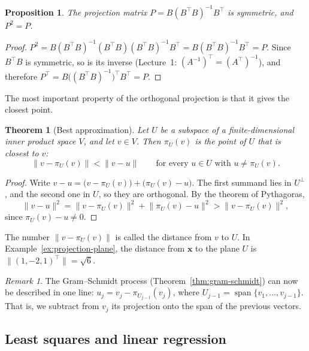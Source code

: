 \documentclass[11pt]{article}
\newcommand{\norm}[1]{\lVert #1 \rVert}
\theoremstyle{definition}
\theoremstyle{plain}
\newtheorem{theorem}[definition]{Theorem}
\newtheorem{proposition}[definition]{Proposition}
\theoremstyle{remark}
\newtheorem{remark}[definition]{Remark}
\DeclareMathOperator{\Span}{span}
\begin{document}
\begin{proposition}\label{prop:projection-matrix}
    The projection matrix $P = B(B^\top B)^{-1}B^\top$ is symmetric, and $P^2 = P$.
\end{proposition}

\begin{proof}
    $P^2 = B(B^\top B)^{-1} (B^\top B) (B^\top B)^{-1} B^\top = B (B^\top B)^{-1} B^\top = P$. Since $B^\top B$ is symmetric, so is its inverse (Lecture~1: $(A^{-1})^\top = (A^\top)^{-1}$), and therefore $P^\top = B \big((B^\top B)^{-1}\big)^\top B^\top = P$.
\end{proof}

The most important property of the orthogonal projection is that it gives the closest point.

\begin{theorem}[Best approximation]\label{thm:best-approximation}
    Let $U$ be a subspace of a finite-dimensional inner product space $V$, and let $v \in V$. Then $\pi_U(v)$ is the point of $U$ that is closest to $v$:
    \[\norm{v - \pi_U(v)} < \norm{v - u} \qquad \text{for every } u \in U \text{ with } u \neq \pi_U(v).\]
\end{theorem}

\begin{proof}
    Write $v - u = \big(v - \pi_U(v)\big) + \big(\pi_U(v) - u\big)$. The first summand lies in $U^\perp$, and the second one in $U$, so they are orthogonal. By the theorem of Pythagoras,
    \[\norm{v - u}^2 = \norm{v - \pi_U(v)}^2 + \norm{\pi_U(v) - u}^2 > \norm{v - \pi_U(v)}^2,\]
    since $\pi_U(v) - u \neq 0$.
\end{proof}

The number $\norm{v - \pi_U(v)}$ is called the distance from $v$ to $U$. In Example~\ref{ex:projection-plane}, the distance from $\mathbf{x}$ to the plane $U$ is $\norm{(1, -2, 1)^\top} = \sqrt{6}$.

\begin{remark}
    The Gram--Schmidt process (Theorem~\ref{thm:gram-schmidt}) can now be described in one line: $u_j = v_j - \pi_{U_{j-1}}(v_j)$, where $U_{j-1} = \Span\{v_1, \ldots, v_{j-1}\}$. That is, we subtract from $v_j$ its projection onto the span of the previous vectors.
\end{remark}

\subsection{Least squares and linear regression}\label{sec:least-squares}
\end{document}

